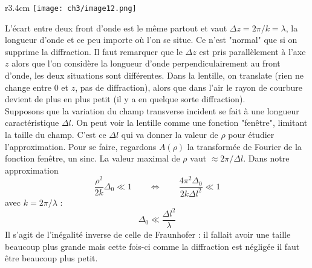 	\begin{wrapfigure}[8]{r}{3.4cm}
	\vspace{-5mm}
	\texttt{[image: ch3/image12.png]}
	\end{wrapfigure}				
	L'écart entre deux front d'onde est le même partout et vaut $\Delta z = 2\pi/k=\lambda$, la longueur d'onde et 
	ce peu importe où l'on se situe. Ce n'est "normal" que si on supprime la diffraction. Il faut remarquer 
	que le $\Delta z$ est pris parallèlement à l'axe $z$ alors que l'on considère la longueur d'onde 
	perpendiculairement au front d'onde, les deux situations sont différentes. Dans la lentille, on translate (rien 	    ne change entre 0 et $z$, pas de diffraction), alors que dans l'air le rayon de courbure devient de plus en plus petit (il y a en quelque sorte diffraction).\\

	Supposons que la variation du champ transverse incident se fait à une longueur caractéristique $\Delta l$. 
	On peut voir la lentille comme une fonction "fenêtre", limitant la taille du champ. C'est ce $\Delta l$ qui 
	va donner la valeur de $\rho$ pour étudier l'approximation. Pour se faire, regardons $A(\rho)$ la 
	transformée de Fourier de la fonction fenêtre, un sinc. La valeur maximal de $\rho$ vaut $\approx 2\pi/
	\Delta l$. Dans notre approximation
	\begin{equation}
	\frac{\rho^2}{2k}\Delta_0 \ll 1\qquad \Leftrightarrow\qquad \dfrac{4\pi^2\Delta_0}{2k\Delta l^2}\ll 1
	\end{equation}
	avec $k=2\pi/\lambda$ :
	\begin{equation}
	\Delta_0 \ll \dfrac{\Delta l^2}{\lambda}
	\end{equation}
	Il s'agit de l'inégalité inverse de celle de Fraunhofer : il fallait avoir une taille beaucoup plus grande 
	mais cette fois-ci comme la diffraction est négligée il faut être beaucoup plus petit.\\
	

